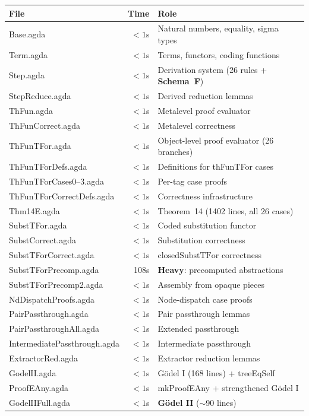 \documentclass[11pt]{article}
\newcommand{\SchemaF}{\textbf{Schema~F}}
\begin{document}
\begin{center}
\begin{tabular}{lrl}
\hline
\textbf{File} & \textbf{Time} & \textbf{Role} \\
\hline
Base.agda & $<1$s & Natural numbers, equality, sigma types \\
Term.agda & $<1$s & Terms, functors, coding functions \\
Step.agda & $<1$s & Derivation system (26 rules + \SchemaF) \\
StepReduce.agda & $<1$s & Derived reduction lemmas \\
ThFun.agda & $<1$s & Metalevel proof evaluator \\
ThFunCorrect.agda & $<1$s & Metalevel correctness \\
ThFunTFor.agda & $<1$s & Object-level proof evaluator (26 branches) \\
ThFunTForDefs.agda & $<1$s & Definitions for thFunTFor cases \\
ThFunTForCases0--3.agda & $<1$s & Per-tag case proofs \\
ThFunTForCorrectDefs.agda & $<1$s & Correctness infrastructure \\
Thm14E.agda & $<1$s & Theorem~14 (1402 lines, all 26 cases) \\
SubstTFor.agda & $<1$s & Coded substitution functor \\
SubstCorrect.agda & $<1$s & Substitution correctness \\
SubstTForCorrect.agda & $<1$s & $\mathrm{closedSubstTFor}$ correctness \\
SubstTForPrecomp.agda & 108s & \textbf{Heavy}: precomputed abstractions \\
SubstTForPrecomp2.agda & $<1$s & Assembly from opaque pieces \\
NdDispatchProofs.agda & $<1$s & Node-dispatch case proofs \\
PairPassthrough.agda & $<1$s & Pair passthrough lemmas \\
PairPassthroughAll.agda & $<1$s & Extended passthrough \\
IntermediatePassthrough.agda & $<1$s & Intermediate passthrough \\
ExtractorRed.agda & $<1$s & Extractor reduction lemmas \\
GodelII.agda & $<1$s & G\"odel I (168 lines) + treeEqSelf \\
ProofEAny.agda & $<1$s & mkProofEAny + strengthened G\"odel I \\
GodelIIFull.agda & $<1$s & \textbf{G\"odel II} ($\sim$90 lines) \\

\end{tabular}
\end{center}
\end{document}
